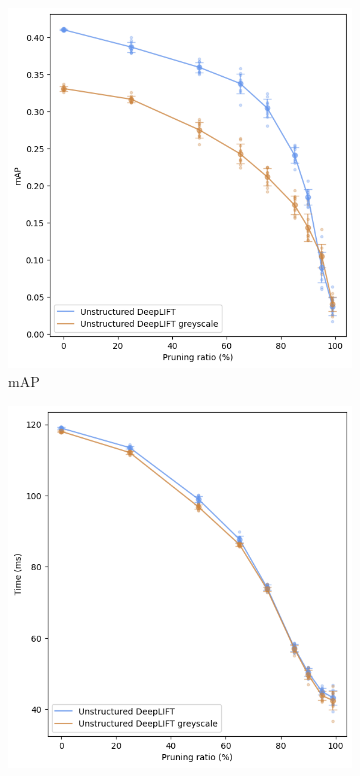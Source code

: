 \documentclass[journal,onecolumn,12pt]{IEEEtran}
\begin{document}
\begin{figure}
    \centering
    \captionsetup{justification=centering}
    \begin{subfigure}[b]{.5\textwidth}
      \centering
      \includegraphics[width=1\linewidth]{figures/mAP2.PNG}
      \caption{mAP}
      \label{fig:mAP2}
    \end{subfigure}%
    \begin{subfigure}[b]{.5\textwidth}
      \centering
      \includegraphics[width=1\linewidth]{figures/time2.PNG}

\end{subfigure}
\end{figure}
\end{document}
